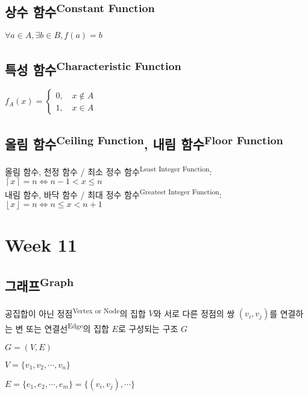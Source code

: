 \subsection{상수 함수\textsuperscript{Constant Function}}
$\forall a \in A, \exists b \in B, f(a) = b$

\subsection{특성 함수\textsuperscript{Characteristic Function}}
$f_A(x) = \begin{cases}
        0,\quad x \not\in A \\
        1,\quad x \in A
    \end{cases}$

\subsection{올림 함수\textsuperscript{Ceiling Function}, 내림 함수\textsuperscript{Floor Function}}
올림 함수, 천정 함수 / 최소 정수 함수\textsuperscript{Least Integer Function}:
$\left\lceil x \right\rceil = n \Leftrightarrow n - 1 < x \leq n$\\
내림 함수, 바닥 함수 / 최대 정수 함수\textsuperscript{Greatest Integer Function}:
$\left\lfloor x \right\rfloor = n \Leftrightarrow n \leq x < n + 1$
\newpage
\section{Week 11}
\subsection{그래프\textsuperscript{Graph}}
공집합이 아닌 정점\textsuperscript{Vertex or Node}의 집합 $V$와 서로 다른 정점의 쌍 $(v_i, v_j)$를 연결하는 변 또는 연결선\textsuperscript{Edge}의 집합 $E$로 구성되는 구조 $G$

$G = (V, E)$

$V = \{v_1, v_2, \cdots, v_n\}$

$E = \{e_1, e_2, \cdots, e_m\} = \{(v_i, v_j), \cdots\}$\\

